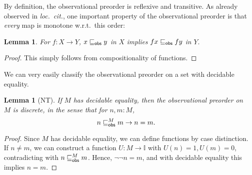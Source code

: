 \documentclass[a4paper,12pt]{amsart}
\newtheorem{lemma}[theorem]{Lemma}
\theoremstyle{definition}
\newcommand{\mbb}[1]{\mathbb{#1}}
\newcommand{\I}{\mbb I}
\begin{document}
By definition, the observational preorder is reflexive and transitive. As already observed in \emph{loc.\ cit.}, one important property of the observational preorder is that \emph{every} map is monotone w.r.t.\ this order:

\begin{lemma}\label{lem:anymapmonotoneintriscorder}
  For $f \colon X \to Y$, $x \obsle y$ in $X$ implies $fx \obsle fy$ in $Y$.
\end{lemma}
\begin{proof}
  This simply follows from compositionality of functions.
\end{proof}

We can very easily classify the observational preorder on a set with decidable equality.

\begin{lemma}[NT]\label{lem:obs-preord-on-set-with-decidable-equality}
  If $M$ has decidable equality, then the observational preorder on $M$ is discrete, in the sense that for $n,m : M$,
  \[ n \obsle[M] m \to n = m\text{.} \]
\end{lemma}
\begin{proof}

  Since $M$ has decidable equality, we can define functions by case distinction. If $n \neq m$, we can construct a function $U : M \to \I$ with $U(n) = 1,U(m) = 0$, contradicting with $n \obsle[M] m$. Hence, $\neg\neg n=m$, and with decidable equality this implies $n = m$.
\end{proof}
\end{document}
